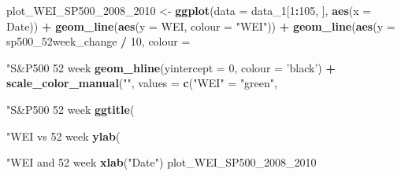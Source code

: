 \documentclass[]{article}
\newenvironment{Shaded}{\begin{snugshade}}{\end{snugshade}}
\newcommand{\KeywordTok}[1]{\textcolor[rgb]{0.13,0.29,0.53}{\textbf{#1}}}
\newcommand{\DataTypeTok}[1]{\textcolor[rgb]{0.13,0.29,0.53}{#1}}
\newcommand{\DecValTok}[1]{\textcolor[rgb]{0.00,0.00,0.81}{#1}}
\newcommand{\StringTok}[1]{\textcolor[rgb]{0.31,0.60,0.02}{#1}}
\newcommand{\OperatorTok}[1]{\textcolor[rgb]{0.81,0.36,0.00}{\textbf{#1}}}
\newcommand{\NormalTok}[1]{#1}
\begin{document}
\begin{Shaded}
\begin{Highlighting}[]
{{{{\NormalTok{plot_WEI_SP500_2008_}\DecValTok{2010}\NormalTok{ <-}\StringTok{ }\KeywordTok{ggplot}\NormalTok{(}\DataTypeTok{data =}\NormalTok{ data_}\DecValTok{1}\NormalTok{[}\DecValTok{1}\OperatorTok{:}\DecValTok{105}\NormalTok{, ], }\KeywordTok{aes}\NormalTok{(}\DataTypeTok{x =}\NormalTok{ Date)) }\OperatorTok{+}
\StringTok{  }\KeywordTok{geom_line}\NormalTok{(}\KeywordTok{aes}\NormalTok{(}\DataTypeTok{y =}\NormalTok{ WEI, }\DataTypeTok{colour =} \StringTok{"WEI"}\NormalTok{)) }\OperatorTok{+}\StringTok{ }
\StringTok{  }\KeywordTok{geom_line}\NormalTok{(}\KeywordTok{aes}\NormalTok{(}\DataTypeTok{y =}\NormalTok{ sp500_52week_change }\OperatorTok{/}\StringTok{ }\DecValTok{10}\NormalTok{, }
                \DataTypeTok{colour =} \StringTok{"S&P500 52 week %change scaled by 10"}\NormalTok{)) }\OperatorTok{+}
\StringTok{  }\KeywordTok{geom_hline}\NormalTok{(}\DataTypeTok{yintercept =} \DecValTok{0}\NormalTok{, }\DataTypeTok{colour =} \StringTok{'black'}\NormalTok{) }\OperatorTok{+}
\StringTok{  }\KeywordTok{scale_color_manual}\NormalTok{(}\StringTok{""}\NormalTok{, }\DataTypeTok{values =} 
     \KeywordTok{c}\NormalTok{(}\StringTok{"WEI"}\NormalTok{ =}\StringTok{ "green"}\NormalTok{, }\StringTok{"S&P500 52 week %change scaled by 10"}\NormalTok{ =}\StringTok{ "blue"}\NormalTok{)) }\OperatorTok{+}\StringTok{ }
\StringTok{  }\KeywordTok{ggtitle}\NormalTok{(}\StringTok{"WEI vs 52 week % change of S&P500 in 2008-2010"}\NormalTok{) }\OperatorTok{+}\StringTok{ }
\StringTok{  }\KeywordTok{ylab}\NormalTok{(}\StringTok{"WEI and 52 week % change S&P500"}\NormalTok{) }\OperatorTok{+}\StringTok{ }
\StringTok{  }\KeywordTok{xlab}\NormalTok{(}\StringTok{"Date"}\NormalTok{)}
\NormalTok{plot_WEI_SP500_2008_}\DecValTok{2010}

}}}}}}}}
\end{Highlighting}
\end{Shaded}
\end{document}

